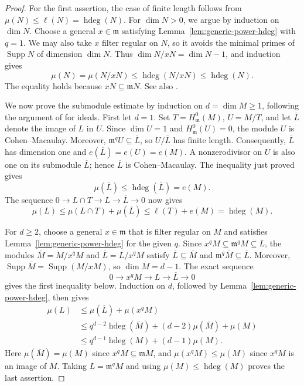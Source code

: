 \documentclass[11pt,reqno]{amsart}
\numberwithin{equation}{section}
\theoremstyle{definition}
\newcommand{\m}{\mathfrak m}
\newcommand{\hdeg}{\operatorname{hdeg}}
\begin{document}
\begin{proof}
For the first assertion, the case of finite length follows from
$\mu(N)\leq\ell(N)=\hdeg(N)$. For $\dim N>0$, we argue by
induction on $\dim N$. Choose a general
$x\in\m$ satisfying Lemma~\ref{lem:generic-power-hdeg} with $q=1$.
We may also take $x$ filter regular on $N$, so it avoids the minimal
primes of $\operatorname{Supp}N$ of dimension $\dim N$. Thus
$\dim N/xN=\dim N-1$, and induction gives
\[
 \mu(N)=\mu(N/xN)\leq\hdeg(N/xN)\leq\hdeg(N).
\]
The equality holds because $xN\subseteq\m N$.
See also \cite[Corollary~3.3]{Vasconcelos1998}.

We now prove the submodule estimate by induction on $d=\dim M\geq1$, following the
argument of \cite[Theorem~3.5]{Vasconcelos1998} for ideals.
First let $d=1$. Set $T=H^0_{\m}(M)$, $U=M/T$, and let
$\overline L$ denote the image of $L$ in $U$.
Since $\dim U=1$ and $H^0_{\m}(U)=0$, the module $U$ is
Cohen--Macaulay. Moreover, $\m^qU\subseteq\overline L$, so
$U/\overline L$ has finite length. Consequently, $\overline L$ has
dimension one and $e(\overline L)=e(U)=e(M)$.
A nonzerodivisor on $U$
is also one on its submodule $\overline L$; hence $\overline L$
is Cohen--Macaulay. The inequality just proved gives
\[
 \mu(\overline L)\leq\hdeg(\overline L)=e(M).
\]
The sequence $0\to L\cap T\to L\to\overline L\to0$ now gives
\[
 \mu(L)\leq\mu(L\cap T)+\mu(\overline L)
 \leq\ell(T)+e(M)=\hdeg(M).
\]

For $d\geq2$, choose a general $x\in\m$ that is filter regular on
$M$ and satisfies Lemma~\ref{lem:generic-power-hdeg} for the given
$q$. Since $x^qM\subseteq\m^qM\subseteq L$, the modules
$\overline M=M/x^qM$ and $\overline L=L/x^qM$ satisfy
$\overline L\subseteq\overline M$ and
$\m^q\overline M\subseteq\overline L$. Moreover,
$\operatorname{Supp}\overline M=\operatorname{Supp}(M/xM)$, so
$\dim\overline M=d-1$.
The exact sequence
\[
 0\longrightarrow x^qM\longrightarrow L\longrightarrow
 \overline L\longrightarrow0
\]
gives the first inequality below. Induction on $d$, followed by
Lemma~\ref{lem:generic-power-hdeg}, then gives
\begin{align*}
 \mu(L)
 &\leq\mu(\overline L)+\mu(x^qM)\\
 &\leq q^{d-2}\hdeg(\overline M)
          +(d-2)\mu(\overline M)+\mu(M)\\
 &\leq q^{d-1}\hdeg(M)+(d-1)\mu(M).
\end{align*}
Here $\mu(\overline M)=\mu(M)$ since $x^qM\subseteq\m M$, and
$\mu(x^qM)\leq\mu(M)$ since $x^qM$ is an image of $M$.
Taking $L=\m^qM$ and using $\mu(M)\leq\hdeg(M)$ proves
the last assertion.
\end{proof}
\end{document}
